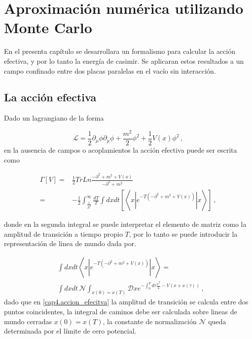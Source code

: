 \chapter{Aproximación numérica utilizando Monte Carlo}
{\label{cap.singular}}

En el presenta capítulo se desarrollara un formalismo para calcular la acción efectiva, y por lo tanto la energía de casimir.
Se aplicaran estos resultados a un campo confinado entre dos placas paralelas en el vacío sin interacción.

\section{La acción efectiva}



Dado un lagrangiano de la forma


\begin{equation}
\mathscr{L} = \frac{1}{2} \partial _{\mu} \phi  \partial _{\mu} \phi +
	\frac{m^2}{2} \phi ^2  + \frac{1}{2} V(x) \phi ^2
	\, ,
\end{equation}
en la ausencia de campos o acoplamientos la acción efectiva puede ser escrita como


\begin{align}
\Gamma \left[ V \right] =&
  \frac{1}{2} Tr Ln \frac{- \partial ^2 + m ^2 + V(x)}{- \partial ^2 + m ^2} \\ 
 =& - \frac{1}{2} \int _{\frac{1}{\Lambda ^2}} ^{\infty} \frac{dT}{T} \int dx dt \left[ \left< x | e ^{-T (- \partial ^2 + m ^2 + V(x))} | x  \right> \right] \, ,
\label{cap4.accion_efecitva}
\end{align}


%

donde en la segunda integral se puede interpretar el elemento de matriz como la amplitud de transición a tiempo propio $T$, por lo tanto se puede introducir la representación de linea de mundo dada por.


\begin{align}
& \int dx  dt \left< x | e ^{-T (- \partial ^2 + m ^2 + V(x))} | x  \right> = \\
& \int dx  dt \, 
\mathcal{N}  \int _{x(0) = x(T)} \mathscr D x e ^{- \int _0 ^T d \tau  \frac{\dot{x} ^2}{4} - V(x + x( \tau )) }
\nonumber
\, ,
\label{eq.definicion_ensamble}
\end{align}
dado que en \eqref{cap4.accion_efecitva} la amplitud de transición se calcula entre dos puntos coincidentes, la integral de caminos debe ser calculada sobre lineas de mundo cerradas $x(0) = x(T)$, la constante de normalización $\mathcal{N}$ queda determinada por el límite de cero potencial.


